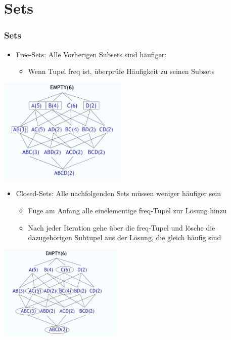 \documentclass{beamer}
\begin{document}
\section{Sets}
\begin{frame} %
	\frametitle{Sets} %
		\begin{itemize}
			\item Free-Sets: Alle Vorherigen Subsets sind häufiger:
				\begin{itemize}
					\item Wenn Tupel freq ist, überprüfe Häufigkeit zu seinen Subsets
				\end{itemize}
		\end{itemize}
		\centering
		\includegraphics[height=5cm]{pictures/free_sets.png}
\end{frame}

\begin{frame}
	\begin{itemize}			
		\item Closed-Sets: Alle nachfolgenden Sets müssen weniger häufiger sein
		\begin{itemize}
			\item Füge am Anfang alle einelementige freq-Tupel zur Lösung hinzu
			\item Nach jeder Iteration gehe über die freq-Tupel und lösche die dazugehörigen Subtupel aus der Lösung, die gleich häufig sind
		\end{itemize}
	\end{itemize}
		\centering
		\includegraphics[height=4.5cm]{pictures/closed_sets.png}
\end{frame}
\end{document}
